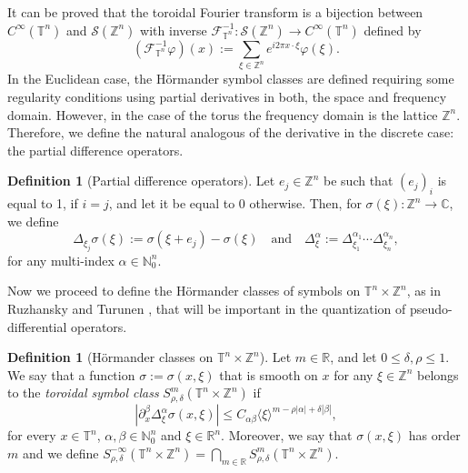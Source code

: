 \documentclass[12pt, reqno]{amsart}
\theoremstyle{definition}
\newtheorem{definition}[theorem]{Definition}
\theoremstyle{remark}
\numberwithin{equation}{section}
\begin{document}
It can be proved that the toroidal Fourier transform is a bijection between $C^\infty(\mathbb{T}^n)$ and $\mathcal{S}(\mathbb{Z}^n)$ with inverse  $\mathcal{F}_{\mathbb{T}^n}^{-1}:  \mathcal{S}(\mathbb{Z}^n) \rightarrow C^\infty(\mathbb{T}^n)$ defined by
    \begin{equation*}
        (\mathcal{F}_{\mathbb{T}^n}^{-1}\varphi)(x) := \sum_{\xi \in \mathbb{Z}^n} e^{i2\pi x \cdot \xi} \varphi(\xi).
    \end{equation*}
In the Euclidean case, the Hörmander symbol classes are defined requiring some regularity conditions using partial derivatives in both, the space and frequency domain. However, in the case of the torus the frequency domain is the lattice $\mathbb{Z}^n$. Therefore, we define the natural analogous of the derivative in the discrete case: the partial difference operators.
\begin{definition}[Partial difference operators]
    Let $e_j \in \mathbb{Z}^n$ be such that $(e_j)_i$ is equal to 1, if $i=j$, and let it be equal to 0 otherwise. Then, for $\sigma(\xi):\mathbb{Z}^n \rightarrow \mathbb{C} $, we define 
    \begin{equation*}
        \Delta_{\xi_j}\sigma(\xi) := 
        \sigma(\xi + e_j) - \sigma(\xi) \quad \text{and} \quad \Delta^\alpha_\xi := \Delta_{\xi_1}^{\alpha_1} \cdots \Delta_{\xi_n}^{\alpha_n},
    \end{equation*}
    for any multi-index $\alpha \in \mathbb{N}^n_0$.
\end{definition}
Now we proceed to define the Hörmander classes of symbols on $ \mathbb{T}^n \times \mathbb{Z}^n $, as in Ruzhansky and Turunen \cite{ruzhansky-turunen}, that will be important in the quantization of pseudo-differential operators.
\begin{definition}[Hörmander classes on $ \mathbb{T}^n \times \mathbb{Z}^n $]
    Let $m \in \mathbb{R} $, and let $0 \leq \delta, \rho\leq 1$. We say that a function $\sigma:=\sigma(x, \xi)$ that is smooth on $x$ for any $\xi \in \mathbb{Z}^n$ belongs to the \textit{toroidal symbol class} $S^m_{\rho,\delta} (\mathbb{T}^n\times \mathbb{Z}^n) $ if 
    \begin{equation*}
        \left|\partial^\beta_x \Delta^\alpha_\xi \sigma(x, \xi)\right| \leq C_{\alpha\beta}\langle\xi\rangle^{m-\rho|\alpha| + \delta|\beta|},
    \end{equation*}
    for every $x \in \mathbb{T}^n$, $\alpha, \beta \in \mathbb{N}^n_0$ and $\xi \in \mathbb{R}^n$. Moreover, we say that $\sigma(x, \xi)$ has order $m$ and we define $S^{-\infty}_{\rho,\delta} (\mathbb{T}^n\times \mathbb{Z}^n) = \bigcap_{m\in\mathbb{R}}S^m_{\rho,\delta} (\mathbb{T}^n\times \mathbb{Z}^n) $.
\end{definition}
\end{document}
